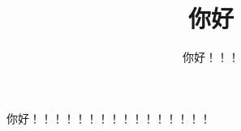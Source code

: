 \documentclass{ctexart}
\title{你好}
\author{你好！！！}
\begin{document}
\maketitle
你好！！！！！！！！！！！！！！！！
\end{document}
